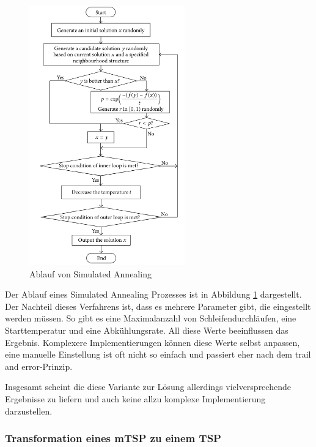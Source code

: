 \begin{figure}[H]
    \centering
    \includegraphics[width=0.6\textwidth]{images/flowSimulatedAnnealing.png}
    \caption{Ablauf von Simulated Annealing \cite{tspSimulatedAnnealing}}
    \label{fig:flowchart_simulated_annealing}
\end{figure}

Der Ablauf eines Simulated Annealing Prozesses ist in Abbildung \ref{fig:flowchart_simulated_annealing} dargestellt. Der Nachteil dieses Verfahrens ist, dass es mehrere Parameter gibt, die eingestellt werden müssen. So gibt es eine Maximalanzahl von Schleifendurchläufen, eine Starttemperatur und eine Abkühlungsrate. All diese Werte beeinflussen das Ergebnis. Komplexere Implementierungen können diese Werte selbst anpassen, eine manuelle Einstellung ist oft nicht so einfach und passiert eher nach dem \glqq{}trail and error\grqq{}-Prinzip. \cite{tspSimulatedAnnealing}

Insgesamt scheint die diese Variante zur Lösung allerdings vielversprechende Ergebnisse zu liefern und auch keine allzu komplexe Implementierung darzustellen.


\subsubsection{Transformation eines mTSP zu einem TSP}
\label{sec:mstpTransofrmation}

